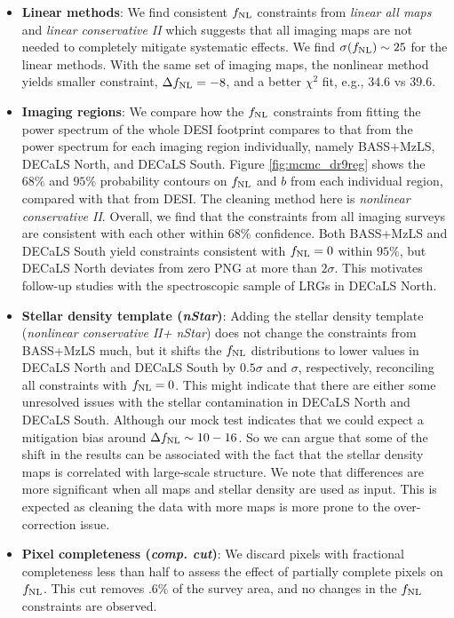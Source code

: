 \begin{itemize}

\item \textbf{Linear methods}: We find consistent $f_{\rm NL}$ constraints from \textit{linear all maps} and \textit{linear conservative II} which suggests that all imaging maps are not needed to completely mitigate systematic effects. We find $\sigma (f_{\rm NL}) \sim 25$ for the linear methods. With the same set of imaging maps, the nonlinear method yields smaller constraint, $\Delta f_{\rm NL} = -8$, and a better $\chi^{2}$ fit, e.g., $34.6$ vs $39.6$.

\item \textbf{Imaging regions}: We compare how the $f_{\rm NL}$ constraints from fitting the power spectrum of the whole DESI footprint compares to that from the power spectrum for each imaging region individually, namely BASS+MzLS, DECaLS North, and DECaLS South. Figure \ref{fig:mcmc_dr9reg} shows the $68\%$ and $95\%$ probability contours on $f_{\rm NL}$ and $b$ from each individual region, compared with that from DESI. The cleaning method here is \textit{nonlinear conservative II}. Overall, we find that the constraints from all imaging surveys are consistent with each other within $68\%$ confidence. Both BASS+MzLS and DECaLS South yield constraints consistent with $f_{\rm NL}=0$ within $95\%$, but DECaLS North deviates from zero PNG at more than $2\sigma$. This motivates follow-up studies with the spectroscopic sample of LRGs in DECaLS North.

\item \textbf{Stellar density template (\textit{nStar})}: Adding the stellar density template (\textit{nonlinear conservative II+ nStar}) does not change the constraints from BASS+MzLS much, but it shifts the $f_{\rm NL}$ distributions to lower values in DECaLS North and DECaLS South by $0.5\sigma$ and $\sigma$, respectively, reconciling all constraints with $f_{\rm NL}=0$. This might indicate that there are either some unresolved issues with the stellar contamination in DECaLS North and DECaLS South. Although our mock test indicates that we could expect a mitigation bias around $\Delta f_{\rm NL} \sim 10-16$. So we can argue that some of the shift in the results can be associated with the fact that the stellar density maps is correlated with large-scale structure. We note that differences are more significant when all maps and stellar density are used as input. This is expected as cleaning the data with more maps is more prone to the over-correction issue.

\item \textbf{Pixel completeness (\textit{comp. cut})}: We discard pixels with fractional completeness less than half to assess the effect of partially complete pixels on $f_{\rm NL}$. This cut removes $.6\%$ of the survey area, and no changes in the $f_{\rm NL}$ constraints are observed.


\end{itemize}
